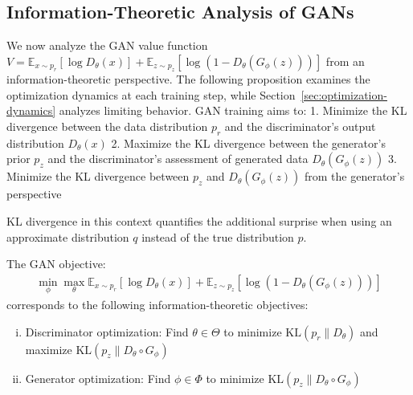 \subsection{Information-Theoretic Analysis of GANs}%
\label{sec:info-value-function}%
We now analyze the GAN value function $V = \mathbb{E}_{x \sim p_r}[\log D_\theta(x)] + \mathbb{E}_{z \sim p_z}[\log(1 - D_\theta(G_\phi(z)))]$ from an information-theoretic perspective. The following proposition examines the optimization dynamics at each training step, while Section~\ref{sec:optimization-dynamics} analyzes limiting behavior.
GAN training aims to:
1. Minimize the KL divergence between the data distribution $p_r$ and the discriminator's output distribution $D_\theta(x)$
2. Maximize the KL divergence between the generator's prior $p_z$ and the discriminator's assessment of generated data $D_\theta(G_\phi(z))$
3. Minimize the KL divergence between $p_z$ and $D_\theta(G_\phi(z))$ from the generator's perspective
\begin{remark}
	KL divergence in this context quantifies the additional surprise when using an approximate distribution $q$ instead of the true distribution $p$.
\end{remark}
\begin{proposition}%
	\label{thm:info-objective}%
	The GAN objective:
	\begin{align}
		\label{eq:gan-objective}
		\min_{\phi} \max_{\theta} \mathbb{E}_{x \sim p_r}[\log D_\theta(x)] + \mathbb{E}_{z \sim p_z}[\log(1 - D_\theta(G_\phi(z)))]
	\end{align}
	corresponds to the following information-theoretic objectives:
	\begin{enumerate}[(i)]
		\item Discriminator optimization: Find $\theta \in \Theta$ to minimize $\text{KL}(p_r \| D_\theta)$ and maximize $\text{KL}(p_z \| D_\theta \circ G_\phi)$
		\item Generator optimization: Find $\phi \in \Phi$ to minimize $\text{KL}(p_z \| D_\theta \circ G_\phi)$
	\end{enumerate}
\end{proposition}
